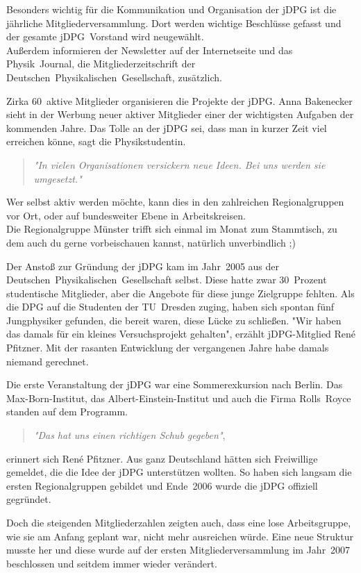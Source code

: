\begin{multicols}{2}
Besonders wichtig für die Kommunikation und Organisation der jDPG ist die jährliche Mitgliederversammlung. Dort werden wichtige Beschlüsse gefasst und der gesamte jDPG~Vorstand wird neugewählt.\\
Außerdem informieren der Newsletter auf der Internetseite und das Physik~Journal, die Mitgliederzeitschrift der Deutschen~Physikalischen~Gesellschaft, zusätzlich.

Zirka 60~aktive Mitglieder organisieren die Projekte der jDPG. Anna Bakenecker sieht in der Werbung neuer aktiver Mitglieder einer der wichtigsten Aufgaben der kommenden Jahre. Das Tolle an der jDPG sei, dass man in kurzer Zeit viel erreichen könne, sagt die Physikstudentin.
\begin{quote}
\textit{"In vielen Organisationen versickern neue Ideen. Bei uns werden sie umgesetzt."}
\end{quote}
Wer selbst aktiv werden möchte, kann dies in den zahlreichen Regionalgruppen vor Ort, oder auf bundesweiter Ebene in Arbeitskreisen.\\
Die Regionalgruppe Münster trifft sich einmal im Monat zum Stammtisch, zu dem auch du gerne vorbeischauen kannst, natürlich unverbindlich ;)

Der Anstoß zur Gründung der jDPG kam im Jahr~2005 aus der Deutschen~Physikalischen~Gesellschaft selbst. Diese hatte zwar 30~Prozent studentische Mitglieder, aber die Angebote für diese junge Zielgruppe fehlten. Als die DPG auf die Studenten der TU~Dresden zuging, haben sich spontan fünf Jungphysiker gefunden, die bereit waren, diese Lücke zu schließen. "Wir haben das damals für ein kleines Versuchsprojekt gehalten", erzählt jDPG-Mitglied René Pfitzner. Mit der rasanten Entwicklung der vergangenen Jahre habe damals niemand gerechnet.

Die erste Veranstaltung der jDPG war eine Sommerexkursion nach Berlin. Das Max-Born-Institut, das Albert-Einstein-Institut und auch die Firma Rolls~Royce standen auf dem Programm.

\begin{quote}
\textit{"Das hat uns einen richtigen Schub gegeben"},
\end{quote}
erinnert sich René Pfitzner. Aus ganz Deutschland hätten sich Freiwillige gemeldet, die die Idee der jDPG unterstützen wollten. So haben sich langsam die ersten Regionalgruppen gebildet und Ende~2006 wurde die jDPG offiziell gegründet.

Doch die steigenden Mitgliederzahlen zeigten auch, dass eine lose Arbeitsgruppe, wie sie am Anfang geplant war, nicht mehr ausreichen würde. Eine neue Struktur musste her und diese wurde auf der ersten Mitgliederversammlung im Jahr~2007 beschlossen und seitdem immer wieder verändert.


\end{multicols}
